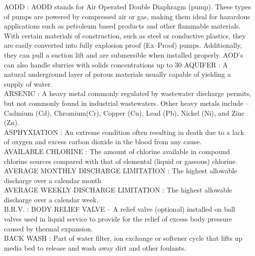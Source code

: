 \vspace{0.15cm}
AODD :   AODD stands for Air Operated Double Diaphragm (pump). These types of pumps are powered by compressed air or gas, making them ideal for hazardous applications such as petroleum based products and other flammable materials. With certain materials of construction, such as steel or conductive plastics, they are easily converted into fully explosion proof (Ex–Proof) pumps. Additionally, they can pull a suction lift and are submersible when installed properly. AOD’s can also handle slurries with solids concentrations up to 30%
\vspace{0.15cm}
AQUIFER :  A natural underground layer of porous materials usually capable of yielding a supply of water.\\
\vspace{0.15cm}
ARSENIC :   A heavy metal commonly regulated by wastewater discharge permits, but not commonly found in industrial wastewaters. Other heavy metals include – Cadmium (Cd), Chromium(Cr), Copper (Cu), Lead (Pb), Nickel (Ni), and Zinc (Zn).\\
\vspace{0.15cm}
ASPHYXIATION :  An extreme condition often resulting in death due to a lack of oxygen and excess carbon dioxide in the blood from any cause. \\
\vspace{0.15cm}
AVAILABLE CHLORINE :  The amount of chlorine available in compound chlorine sources compared with that of elemental (liquid or gaseous) chlorine.\\
\vspace{0.15cm}
AVERAGE MONTHLY DISCHARGE LIMITATION :  The highest allowable discharge over a calendar month \\
\vspace{0.15cm}
AVERAGE WEEKLY DISCHARGE LIMITATION :  The highest allowable discharge over a calendar week. \\
\vspace{0.15cm}
B.R.V. :  BODY RELIEF VALVE –  A relief valve (optional) installed on ball valves used in liquid service to provide for the relief of excess body pressure caused by thermal expansion.\\
\vspace{0.15cm}
BACK WASH :  Part of water filter, ion exchange or softener cycle that lifts up media bed to release and wash away dirt and other foulants.\\
